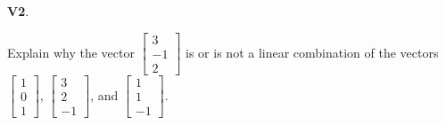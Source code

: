 \documentclass{article}
\newenvironment{problem}[1]
{
  \begin{flushleft}
  \textbf{#1}.
  \ignorespaces
}
{
  \end{flushleft}
}
\begin{document}
\begin{problem}{V2}
Explain why the vector \(\begin{bmatrix} 3 \\ -1 \\ 2 \end{bmatrix} \) is or is not a linear combination of the vectors
\(\begin{bmatrix} 1 \\ 0 \\ 1 \end{bmatrix} \),
\(\begin{bmatrix} 3 \\ 2 \\ -1 \end{bmatrix} \), and
\(\begin{bmatrix} 1 \\ 1 \\ -1 \end{bmatrix} \).
\end{problem}
\end{document}
